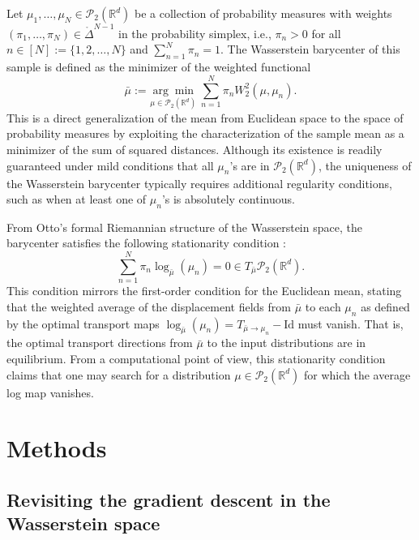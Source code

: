 \documentclass[11pt]{article}
\newcommand{\bbR}{\mathbb{R}}
\newcommand{\calP}{\mathcal{P}}
\begin{document}
Let $\mu_1, \ldots, \mu_N \in \calP_2(\bbR^d)$ be a collection of probability measures with weights $(\pi_1, \ldots, \pi_N) \in \mathring{\Delta}^{N-1}$ in the probability simplex, i.e., $\pi_n > 0$ for all $n\in [N]:=\lbrace 1, 2, \ldots, N\rbrace$ and $\sum_{n=1}^N \pi_n = 1$. The Wasserstein barycenter \citep{agueh_2011_BarycentersWassersteinSpace}
of this sample is defined as the minimizer of the weighted functional
\begin{equation}\label{eq:definition_barycenter}
    \bar{\mu} := \underset{\mu \in \calP_2(\bbR^d)}{\arg\min}~ \sum_{n=1}^N \pi_n W_2^2(\mu, \mu_n).
\end{equation}
This is a direct generalization of the mean from Euclidean space to the space of probability measures by exploiting the characterization of the sample mean as a minimizer of the sum of squared distances. Although its existence is readily guaranteed under mild conditions that all $\mu_n$'s are in $\calP_2(\bbR^d)$, the uniqueness of the Wasserstein barycenter typically requires additional regularity conditions, such as when at least one of $\mu_n$'s is absolutely continuous.

From Otto's formal Riemannian structure of the Wasserstein space, the barycenter satisfies the following stationarity condition \citep{lanzetti_2025_FirstOrderConditionsOptimization}:
\begin{equation}\label{eq:stationarity_condition}
    \sum_{n=1}^N \pi_n \log_{\bar{\mu}}(\mu_n) = 0 \in T_{\bar{\mu}}\calP_2(\bbR^d).
\end{equation}
This condition mirrors the first-order condition for the Euclidean mean, stating that the weighted average of the displacement fields from $\bar{\mu}$ to each $\mu_n$ as defined by the optimal transport maps $\log_{\bar{\mu}}(\mu_n) = T_{\bar{\mu} \to \mu_n} - \text{Id}$ must vanish. That is, the optimal transport directions from $\bar{\mu}$ to the input distributions are in equilibrium. From a computational point of view, this stationarity condition claims that one may search for a distribution $\mu \in \calP_2(\bbR^d)$ for which the average log map vanishes.

\section{Methods}\label{sec:chp3-methods}


\subsection{Revisiting the gradient descent in the Wasserstein space}
\end{document}
